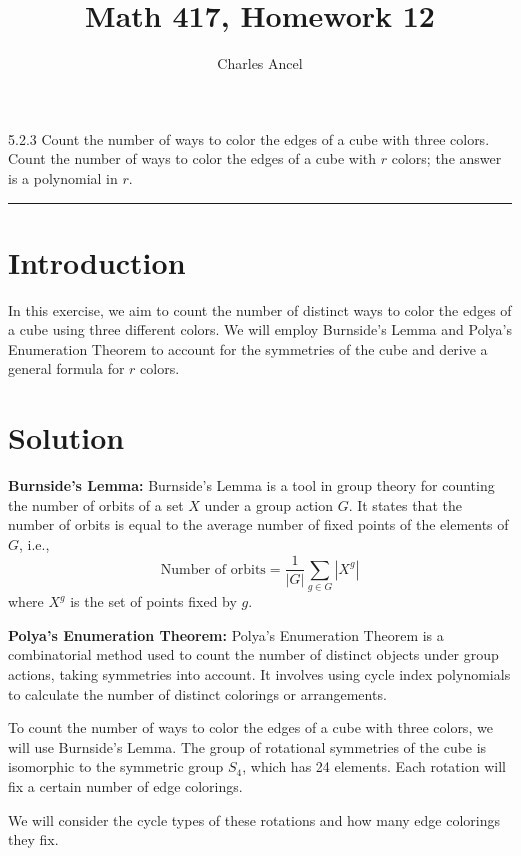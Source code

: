 \documentclass[12pt]{amsart}
\title{Math 417, Homework 12}
\author{Charles Ancel}
\theoremstyle{definition}
\numberwithin{equation}{section}
\begin{document}
\maketitle

\begin{exercise}{5.2.3} Count the number of ways to color the edges of a cube with three colors. Count the number of ways to color the edges of a cube with \(r\) colors; the answer is a polynomial in \(r\).

    \noindent\rule{\linewidth}{1pt}

    \section*{Introduction}
    
    In this exercise, we aim to count the number of distinct ways to color the edges of a cube using three different colors. We will employ Burnside's Lemma and Polya's Enumeration Theorem to account for the symmetries of the cube and derive a general formula for \(r\) colors.

    \section*{Solution}
    
    \noindent \textbf{Burnside's Lemma:} Burnside's Lemma is a tool in group theory for counting the number of orbits of a set \(X\) under a group action \(G\). It states that the number of orbits is equal to the average number of fixed points of the elements of \(G\), i.e.,
    \[
    \text{Number of orbits} = \frac{1}{|G|} \sum_{g \in G} |X^g|
    \]
    where \(X^g\) is the set of points fixed by \(g\).

    \noindent \textbf{Polya's Enumeration Theorem:} Polya's Enumeration Theorem is a combinatorial method used to count the number of distinct objects under group actions, taking symmetries into account. It involves using cycle index polynomials to calculate the number of distinct colorings or arrangements.

    To count the number of ways to color the edges of a cube with three colors, we will use Burnside's Lemma. The group of rotational symmetries of the cube is isomorphic to the symmetric group \(S_4\), which has 24 elements. Each rotation will fix a certain number of edge colorings.

    We will consider the cycle types of these rotations and how many edge colorings they fix.


\end{exercise}
\end{document}

